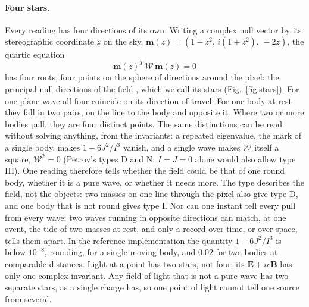 \paragraph{Four stars.} Every reading has four directions of its own. Writing a
complex null vector by its stereographic coordinate $z$ on the sky,
$\mathbf{m}(z) = (1 - z^2,\, i(1 + z^2),\, -2z)$, the quartic equation
\begin{equation}\label{eq:stars}
\mathbf{m}(z)^{T}\,\mathcal{W}\,\mathbf{m}(z) = 0
\end{equation}
has four roots, four points on the sphere of directions around the pixel: the
principal null directions of the field \cite{Penrose1960}, which we call its
stars (Fig.~\ref{fig:stars}). For one plane wave all four coincide on its
direction of travel. For one body at rest they fall in two pairs, on the line to
the body and opposite it. Where two or more bodies pull, they are four distinct
points. The same
distinctions can be read without solving anything, from the invariants: a
repeated eigenvalue, the mark of a single body, makes
$1 - 6J^2/I^3$ vanish, and a single wave makes $\mathcal W$ itself a square,
$\mathcal W^2 = 0$ (Petrov's types D and N; $I = J = 0$ alone would also allow
type III). One reading therefore tells whether the field could be that of one
round body, whether it is a pure wave, or whether it needs more. The type
describes the field, not the objects: two masses on one line through the pixel
also give type D, and one body that is not round gives type I. Nor can one
instant tell every pull from every wave: two waves running in opposite
directions can match, at one event, the tide of two masses at rest, and only a
record over time, or over space, tells them apart. In the reference
implementation the quantity $1 - 6J^2/I^3$ is below $10^{-8}$, rounding, for a
single moving body, and $0.02$ for two bodies at comparable distances.
Light at a point has two stars, not four: its $\mathbf{E} + ic\mathbf{B}$ has
only one complex invariant. Any field of light that is not a pure wave has two
separate stars, as a single charge has, so one point of light cannot tell one
source from several.

